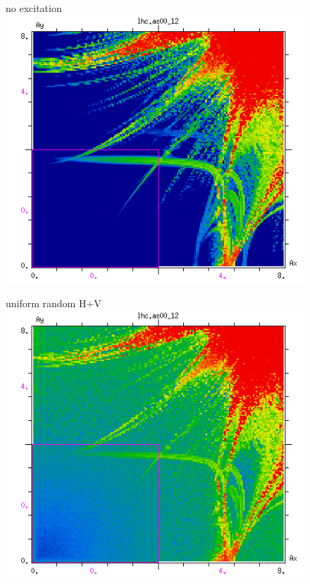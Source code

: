 \documentclass[%
 reprint,
 amsmath,amssymb,
 aps,
prstab,
]{revtex4-1}
\begin{document}
\begin{figure}[t]
	\begin{minipage}[t]{0.49\linewidth}
		\centering
		no excitation
		\includegraphics[width=1.0\linewidth]{2017injnocolc15o+19_6noerru_dp0_amp.png}
	\end{minipage}
	\begin{minipage}[t]{0.49\linewidth}
		\centering
		uniform random H+V
		\includegraphics[width=1.0\linewidth]{2017injnocolc15o+19_6noerruranadthv_1nrad_dp0_amp.png}

\end{minipage}
\end{figure}
\end{document}

